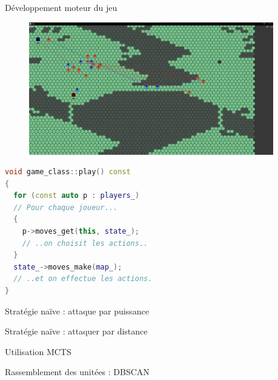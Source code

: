 \documentclass[french]{beamer}
\begin{document}
\begin{frame}{Développement moteur du jeu}
	\begin{figure}
		\centering
		\begin{minipage}{0.49\textwidth}
			\centering
			
		\end{minipage}\hfill
		\begin{minipage}{0.49\textwidth}
			\centering
			\includegraphics[width=0.95\textwidth]{screen_carte_pleine.png}
		\end{minipage}
	\end{figure}
\end{frame}
\begin{frame}[fragile]
	\small
	\begin{lstlisting}[language=C++,basicstyle=\ttfamily,keywordstyle=\color{red}]
void game_class::play() const
{
  for (const auto p : players_)
  // Pour chaque joueur...
  {
    p->moves_get(this, state_);
    // ..on choisit les actions..
  }
  state_->moves_make(map_);
  // ..et on effectue les actions.
}
	\end{lstlisting}
\end{frame}
\begin{frame}{Stratégie naïve : attaque par puissance}
	
\end{frame}
\begin{frame}{Stratégie naïve : attaquer par distance}
	
\end{frame}
\begin{frame}{Utilisation MCTS}
	
\end{frame}
\begin{frame}{Rassemblement des unitées : DBSCAN}
	
\end{frame}
\end{document}
